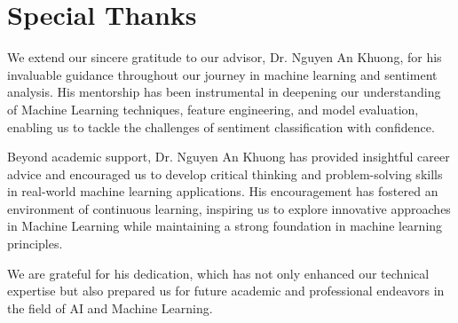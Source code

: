 \section{Special Thanks}

We extend our sincere gratitude to our advisor, Dr. Nguyen An Khuong, for his invaluable guidance throughout our journey in machine learning and sentiment analysis. His mentorship has been instrumental in deepening our understanding of Machine Learning techniques, feature engineering, and model evaluation, enabling us to tackle the challenges of sentiment classification with confidence.

Beyond academic support, Dr. Nguyen An Khuong has provided insightful career advice and encouraged us to develop critical thinking and problem-solving skills in real-world machine learning applications. His encouragement has fostered an environment of continuous learning, inspiring us to explore innovative approaches in Machine Learning while maintaining a strong foundation in machine learning principles.

We are grateful for his dedication, which has not only enhanced our technical expertise but also prepared us for future academic and professional endeavors in the field of AI and Machine Learning.
